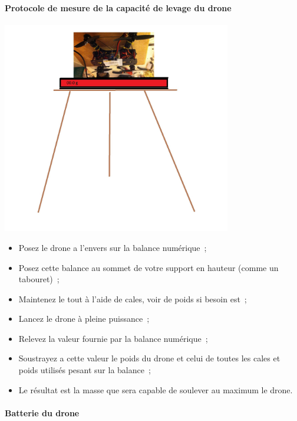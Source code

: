 \documentclass[a4paper,11pt]{article}
\begin{document}
\paragraph{Protocole de mesure de la capacité de levage du drone}

\begin{center}
	\includegraphics[width=10cm]{../Images/protocole_levage_drone.jpg}
\end{center}

\begin{itemize}
	\item Posez le drone a l'envers sur la balance numérique~;
	\item Posez cette balance au sommet de votre support en hauteur (comme un tabouret)~;
	\item Maintenez le tout à l'aide de cales, voir de poids si besoin est~;
	\item Lancez le drone à pleine puissance~;
	\item Relevez la valeur fournie par la balance numérique~;
	\item Soustrayez a cette valeur le poids du drone et celui de toutes les cales et poids utilisés pesant sur la balance~;
	\item Le résultat est la masse que sera capable de soulever au maximum le drone.
\end{itemize}

\paragraph{Batterie du drone}
\end{document}
